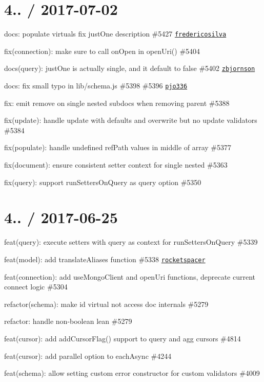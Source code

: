 \section*{4.. / 2017-\/07-\/02 }


\begin{DoxyItemize}
\item docs\+: populate virtuals fix just\+One description \#5427 \href{https://github.com/fredericosilva}{\tt fredericosilva}
\begin{DoxyItemize}
\item fix(connection)\+: make sure to call on\+Open in open\+Uri() \#5404
\item docs(query)\+: just\+One is actually single, and it default to false \#5402 \href{https://github.com/zbjornson}{\tt zbjornson}
\item docs\+: fix small typo in lib/schema.\+js \#5398 \#5396 \href{https://github.com/pjo336}{\tt pjo336}
\item fix\+: emit remove on single nested subdocs when removing parent \#5388
\item fix(update)\+: handle update with defaults and overwrite but no update validators \#5384
\item fix(populate)\+: handle undefined ref\+Path values in middle of array \#5377
\item fix(document)\+: ensure consistent setter context for single nested \#5363
\item fix(query)\+: support run\+Setters\+On\+Query as query option \#5350
\end{DoxyItemize}
\end{DoxyItemize}

\section*{4.. / 2017-\/06-\/25 }


\begin{DoxyItemize}
\item feat(query)\+: execute setters with query as context for {\ttfamily run\+Setters\+On\+Query} \#5339
\item feat(model)\+: add translate\+Aliases function \#5338 \href{https://github.com/rocketspacer}{\tt rocketspacer}
\item feat(connection)\+: add {\ttfamily use\+Mongo\+Client} and {\ttfamily open\+Uri} functions, deprecate current connect logic \#5304
\item refactor(schema)\+: make id virtual not access doc internals \#5279
\item refactor\+: handle non-\/boolean lean \#5279
\item feat(cursor)\+: add add\+Cursor\+Flag() support to query and agg cursors \#4814
\item feat(cursor)\+: add parallel option to each\+Async \#4244
\item feat(schema)\+: allow setting custom error constructor for custom validators \#4009
\end{DoxyItemize}

